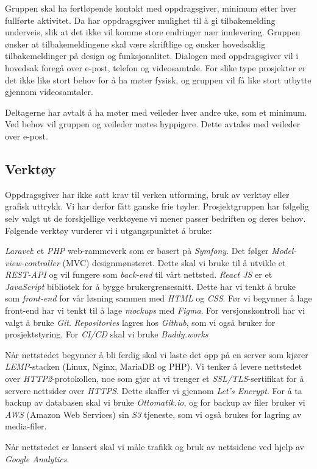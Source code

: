 \documentclass[11pt,a4paper]{report}
\begin{document}
Gruppen skal ha fortløpende kontakt med oppdragsgiver, minimum etter hver fullførte aktivitet. Da har oppdragsgiver mulighet til å gi tilbakemelding underveis, slik at det ikke vil komme store endringer nær innlevering. Gruppen ønsker at tilbakemeldingene skal være skriftlige og ønsker hovedsaklig tilbakemeldinger på design og funksjonalitet. Dialogen med oppdragsgiver vil i hovedsak foregå over e-post, telefon og videosamtale. For slike type prosjekter er det ikke like stort behov for å ha møter fysisk, og gruppen vil få like stort utbytte gjennom videosamtaler. 

Deltagerne har avtalt å ha møter med veileder hver andre uke, som et minimum. Ved behov vil gruppen og veileder møtes hyppigere. Dette avtales med veileder over e-post.

\subsection*{Verktøy}

Oppdragsgiver har ikke satt krav til verken utforming, bruk av verktøy eller grafisk uttrykk. Vi har derfor fått ganske frie tøyler. Prosjektgruppen har følgelig selv valgt ut de forskjellige verktøyene vi mener passer bedriften og deres behov. Følgende verktøy vurderer vi i utgangspunktet å bruke:

\textit{Laravel}: et \textit{PHP} web-rammeverk som er basert på \textit{Symfony}. Det følger \textit{Model-view-controller} (MVC) designmønsteret. Dette skal vi bruke til å utvikle et \textit{REST-API} og vil fungere som \textit{back-end} til vårt nettsted.
\textit{React JS} er et \textit{JavaScript} bibliotek for å bygge brukergrensesnitt. Dette har vi tenkt å bruke som \textit{front-end} for vår løsning sammen med \textit{HTML} og \textit{CSS}. Før vi begynner å lage front-end har vi tenkt til å lage \textit{mockups} med \textit{Figma}.
For versjonskontroll har vi valgt å bruke \textit{Git}.
\textit{Repositories} lagres hos \textit{Github}, som vi også bruker for prosjektstyring. For  \textit{CI/CD} skal vi bruke \textit{Buddy.works}

Når nettstedet begynner å bli ferdig skal vi laste det opp på en server som kjører \textit{LEMP}-stacken (Linux, Nginx, MariaDB og PHP). Vi tenker å levere nettstedet over \textit{HTTP2}-protokollen, noe som gjør at vi trenger et \textit{SSL/TLS}-sertifikat for å servere nettsider over \textit{HTTPS}. Dette skaffer vi gjennom \textit{Let's Encrypt}. For å ta backup av databasen skal vi bruke \textit{Ottomatik.io}, og for backup av filer bruker vi \textit{AWS} (Amazon Web Services) sin \textit{S3} tjeneste, som vi også brukes for lagring av media-filer.

Når nettstedet er lansert skal vi måle trafikk og bruk av nettsidene ved hjelp av \textit{Google Analytics}.
\end{document}

